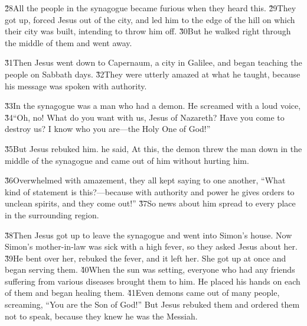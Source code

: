 \v{28}All the people in the synagogue became furious when they heard this. \v{29}They got up, forced Jesus out of the city, and led him to the edge of the hill on which their city was built, intending to throw him off. \v{30}But he walked right through the middle of them and went away.

\v{31}Then Jesus went down to Capernaum, a city in Galilee, and began teaching the people on Sabbath days. \v{32}They were utterly amazed at what he taught, because his message was spoken with authority.

\v{33}In the synagogue was a man who had a demon. He screamed with a loud voice, \v{34}``Oh, no! What do you want with us, Jesus of Nazareth? Have you come to destroy us? I know who you are---the Holy One of God!''

\v{35}But Jesus rebuked him.  he said, At this, the demon threw the man down in the middle of the synagogue and came out of him without hurting him.

\v{36}Overwhelmed with amazement, they all kept saying to one another, ``What kind of statement is this?---because with authority and power he gives orders to unclean spirits, and they come out!'' \v{37}So news about him spread to every place in the surrounding region.

\v{38}Then Jesus got up to leave the synagogue and went into Simon's house. Now Simon's mother-in-law was sick with a high fever, so they asked Jesus about her. \v{39}He bent over her, rebuked the fever, and it left her. She got up at once and began serving them. \v{40}When the sun was setting, everyone who had any friends suffering from various diseases brought them to him. He placed his hands on each of them and began healing them. \v{41}Even demons came out of many people, screaming, ``You are the Son of God!'' But Jesus rebuked them and ordered them not to speak, because they knew he was the Messiah.

